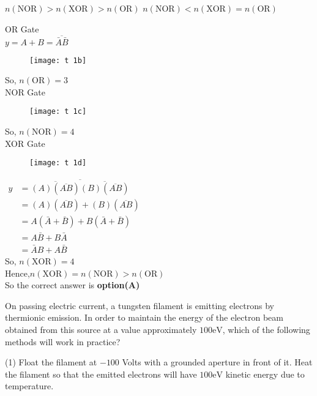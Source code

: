 \begin{questions}
\begin{tasks}
	\task[\textbf{C.}] $n(\mathrm{NOR})>n(\mathrm{XOR})>n(\mathrm{OR})$
	\task[\textbf{D.}]   $n(\mathrm{NOR})<n(\mathrm{XOR})=n(\mathrm{OR})$
\end{tasks}
\begin{answer}
	OR Gate\\$y=A+B=\overline{\bar{A} \bar{B}}$
	\begin{figure}[H]
		\centering
		\texttt{[image: t 1b]}\\
	\end{figure}
So, $n(\mathrm{OR})=3$\\
NOR Gate\\
\begin{figure}[H]
	\centering
	\texttt{[image: t 1c]}\\
\end{figure}
	So, $n(\mathrm{NOR})=4$\\
XOR Gate\\
\begin{figure}[H]
	\centering
	\texttt{[image: t 1d]}
	\end{figure}
$\begin{aligned} y &=\overline{\overline{(A)(\overline{A B})} \overline{(B)(\overline{A B})}} \\ &=(A)(\overline{A B})+(B)(\overline{A B}) \\ &=A(\bar{A}+\bar{B})+B(\bar{A}+\bar{B}) \\ &=A \bar{B}+B \bar{A} \\ &=\bar{A} B+A \bar{B} \end{aligned}$\\
So, $n(\mathrm{XOR})=4$\\ Hence,$n(\mathrm{XOR})=n(\mathrm{NOR})>n(\mathrm{OR})$\\
	So the correct answer is \textbf{option(A)}
\end{answer}
\begin{minipage}{\textwidth}
	\question On passing electric current, a tungsten filament is emitting electrons by thermionic emission. In order to maintain the energy of the electron beam obtained from this source at a value approximately $100 \mathrm{eV}$, which of the following methods will work in practice?
\end{minipage}
\begin{tasks}(1)
	\task[\textbf{A.}]   Float the filament at $-100$ Volts with a grounded aperture in front of it.
	\task[\textbf{B.}] Heat the filament so that the emitted electrons will have $100 \mathrm{eV}$ kinetic energy due to temperature.

\end{tasks}
\end{questions}
